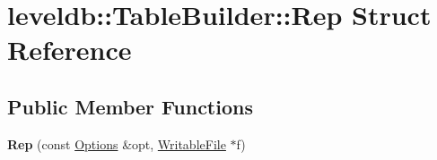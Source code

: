 \hypertarget{structleveldb_1_1_table_builder_1_1_rep}{}\section{leveldb\+:\+:Table\+Builder\+:\+:Rep Struct Reference}
\label{structleveldb_1_1_table_builder_1_1_rep}
\subsection*{Public Member Functions}
\begin{DoxyCompactItemize}
\item 
\mbox{\label{structleveldb_1_1_table_builder_1_1_rep_a9d68c60c57e7336aa1fd10fc9f32213e}} 
{\bfseries Rep} (const \mbox{\hyperlink{structleveldb_1_1_options}{Options}} \&opt, \mbox{\hyperlink{classleveldb_1_1_writable_file}{Writable\+File}} $\ast$f)
\end{DoxyCompactItemize}

